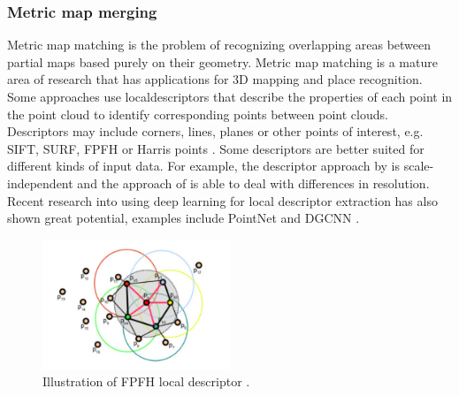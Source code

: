 \subsubsection{Metric map merging}
Metric map matching is the problem of recognizing overlapping areas between partial maps based purely on their geometry. Metric map matching is a mature area of research that has applications for 3D mapping and place recognition.  Some approaches use \gls{localdescriptor}s that describe the properties of each point in the point cloud to identify corresponding points between point clouds. Descriptors may include corners, lines, planes or other points of interest, e.g. SIFT, SURF, FPFH or Harris points \citep{andersone_heterogeneous_2019,rusu_fast_2009}. Some descriptors are better suited for different kinds of input data. For example, the descriptor approach by \citet{li_general_2010} is scale-independent and the approach of \citet{yang_fast_2016} is able to deal with differences in resolution. Recent research into using deep learning for local descriptor extraction has also shown great potential, examples include PointNet and DGCNN \citep{qi_pointnet_2017,phan_dgcnn_2018}.

\begin{figure}[h]
    \centering
    \includegraphics*[width=0.5\textwidth]{./fig/fpfh.png}
    \caption{Illustration of FPFH local descriptor \citep{rusu_fast_2009}.}
    \label{fig:huang}
\end{figure}

